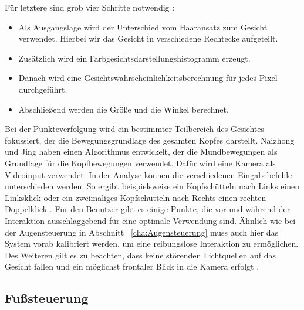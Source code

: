 Für letztere sind grob vier Schritte notwendig \cite{FaceTracking}:
\begin{itemize}
      \item Als Ausgangslage wird der Unterschied vom Haaransatz zum Gesicht verwendet. Hierbei wir das Gesicht in verschiedene Rechtecke aufgeteilt.
      \item Zusätzlich wird ein Farbgesichtsdarstellungshistogramm erzeugt.
			\item Danach wird eine Gesichtswahrscheinlichkeitsberechnung für jedes Pixel durchgeführt.
			\item Abschließend werden die Größe und die Winkel berechnet.
\end{itemize}
\vspace{\baselineskip}
Bei der Punkteverfolgung wird ein bestimmter Teilbereich des Gesichtes fokussiert, der die Bewegungsgrundlage des gesamten Kopfes darstellt. Naizhong und Jing \cite{MouthChinaControl} haben einen Algorithmus entwickelt, der die Mundbewegungen als Grundlage für die Kopfbewegungen verwendet. Dafür wird eine Kamera als Videoinput verwendet. In der Analyse können die verschiedenen Eingabebefehle unterschieden werden. So ergibt beispielsweise ein Kopfschütteln nach Links einen Linksklick oder ein zweimaliges Kopfschütteln nach Rechts einen rechten Doppelklick \cite{MouthChinaControl}.
\newline \newline
Für den Benutzer gibt es einige Punkte, die vor und während der Interaktion ausschlaggebend für eine optimale Verwendung sind. Ähnlich wie bei der Augensteuerung in Abschnitt ~\ref{cha:Augensteuerung} muss auch hier das System vorab kalibriert werden, um eine reibungslose Interaktion zu ermöglichen. Des Weiteren gilt es zu beachten, dass keine störenden Lichtquellen auf das Gesicht fallen und ein möglichst frontaler Blick in die Kamera erfolgt \cite{MouthChinaControl}.


\subsection{Fußsteuerung}

